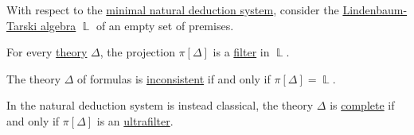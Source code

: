 \begin{proposition}\label{thm:lindenbaum_tarski_theories}
  With respect to the \hyperref[def:propositional_natural_deduction_systems]{minimal natural deduction system}, consider the \hyperref[def:lindenbaum_tarski_algebra]{Lindenbaum-Tarski algebra} \( \BbbL \) of an empty set of premises.

  \begin{thmenum}
     For every \hyperref[def:logical_theory]{theory} \( \Delta \), the projection \( \pi[\Delta] \) is a \hyperref[def:lattice_ideal]{filter} in \( \BbbL \).

     The theory \( \Delta \) of formulas is \hyperref[def:consistent_set_of_sentences]{inconsistent} if and only if \( \pi[\Delta] = \BbbL \).

     In the natural deduction system is instead classical, the theory \( \Delta \) is \hyperref[def:complete_set_of_sentences]{complete} if and only if \( \pi[\Delta] \) is an \hyperref[def:ultrafilter]{ultrafilter}.
  \end{thmenum}
\end{proposition}
